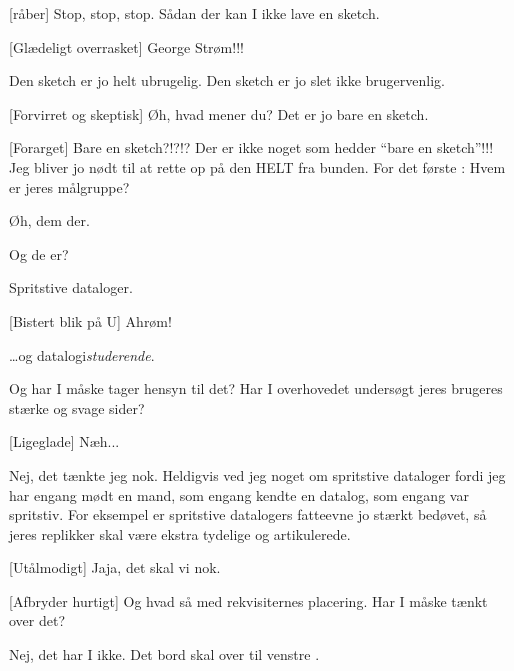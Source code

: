 \documentclass[a4paper,11pt]{article}
\begin{document}
\begin{sketch}
  [råber]  Stop, stop, stop. Sådan der kan I ikke lave
  en sketch.
  
  [Glædeligt overrasket] 
  George Strøm!!!
  
   Den sketch er jo helt ubrugelig. Den sketch er jo slet
  ikke brugervenlig.
  
  [Forvirret og skeptisk] Øh, hvad mener du? Det er jo bare en
  sketch.
  
  [Forarget] Bare en sketch?!?!? Der er ikke noget som hedder
  ``bare en sketch''!!! Jeg bliver jo nødt til at rette op på den HELT
  fra bunden. For det første : Hvem er jeres målgruppe?
  
  
    Øh, dem der.
  
   
  Og de er?
  
   Spritstive dataloger.
  
  [Bistert blik på U] Ahrøm!
  
  \ldots og datalogi\emph{studerende}.
  
   Og har I måske tager hensyn til det? Har I overhovedet
  undersøgt jeres brugeres stærke og svage sider?
  
  [Ligeglade] Næh...
  
   Nej, det tænkte jeg nok. Heldigvis ved jeg noget om
  spritstive dataloger  fordi jeg har
  engang mødt en mand, som engang kendte en datalog, som engang var
  spritstiv.  For eksempel er spritstive datalogers fatteevne jo
  stærkt bedøvet, så jeres replikker skal være ekstra tydelige og
  artikulerede.
  
  [Utålmodigt] Jaja, det skal vi nok. 
  
  [Afbryder hurtigt] Og hvad så med rekvisiternes placering.
  Har I måske tænkt over det?
  
  
   Nej, det har I ikke. Det bord  skal
  over til venstre .
  

\end{sketch}
\end{document}
